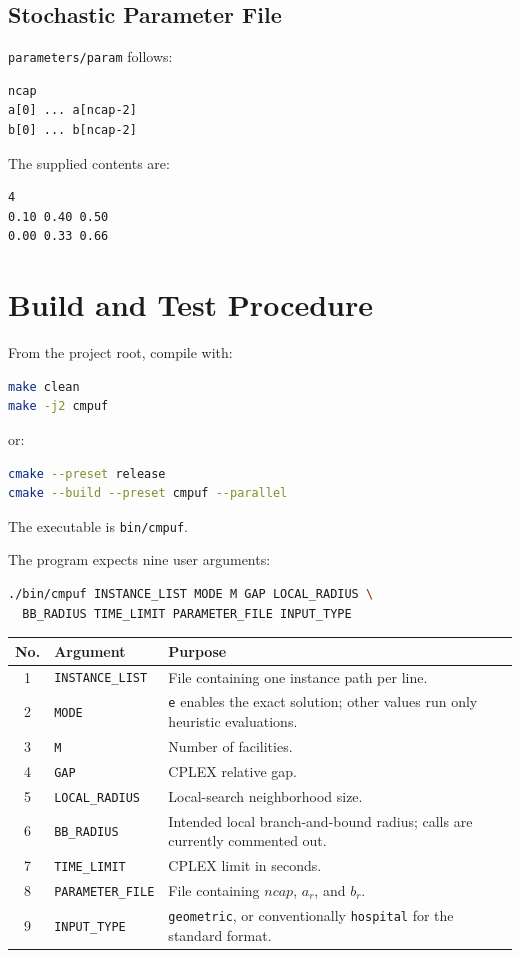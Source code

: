 \documentclass[11pt,a4paper]{article}
\newcommand{\code}[1]{\texttt{#1}}
\begin{document}
\subsection{Stochastic Parameter File}

\code{parameters/param} follows:
\begin{lstlisting}
ncap
a[0] ... a[ncap-2]
b[0] ... b[ncap-2]
\end{lstlisting}
The supplied contents are:
\begin{lstlisting}
4
0.10 0.40 0.50
0.00 0.33 0.66
\end{lstlisting}

\section{Build and Test Procedure}

From the project root, compile with:
\begin{lstlisting}[language=bash]
make clean
make -j2 cmpuf
\end{lstlisting}
or:
\begin{lstlisting}[language=bash]
cmake --preset release
cmake --build --preset cmpuf --parallel
\end{lstlisting}
The executable is \code{bin/cmpuf}.

The program expects nine user arguments:
\begin{lstlisting}[language=bash]
./bin/cmpuf INSTANCE_LIST MODE M GAP LOCAL_RADIUS \
  BB_RADIUS TIME_LIMIT PARAMETER_FILE INPUT_TYPE
\end{lstlisting}

\begin{longtable}{clp{8.8cm}}
\toprule
No.&Argument&Purpose\\ \midrule \endhead
1&\code{INSTANCE\_LIST}&File containing one instance path per line.\\
2&\code{MODE}&\code{e} enables the exact solution; other values run only
heuristic evaluations.\\
3&\code{M}&Number of facilities.\\
4&\code{GAP}&CPLEX relative gap.\\
5&\code{LOCAL\_RADIUS}&Local-search neighborhood size.\\
6&\code{BB\_RADIUS}&Intended local branch-and-bound radius; calls are
currently commented out.\\
7&\code{TIME\_LIMIT}&CPLEX limit in seconds.\\
8&\code{PARAMETER\_FILE}&File containing $ncap$, $a_r$, and $b_r$.\\
9&\code{INPUT\_TYPE}&\code{geometric}, or conventionally \code{hospital} for
the standard format.\\ \bottomrule
\end{longtable}
\end{document}
